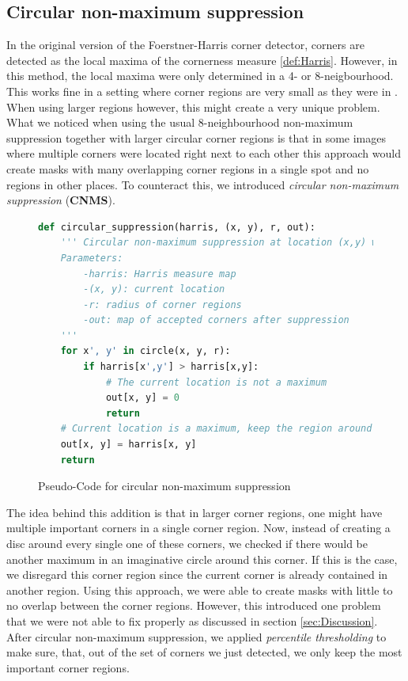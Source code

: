 \subsection{Circular non-maximum suppression}\label{sub:Suppression}
In the original version of the Foerstner-Harris corner detector, corners are detected as the local
maxima of the cornerness measure \eqref{def:Harris}. However, in this method, the local maxima were
only determined in a 4- or 8-neigbourhood. This works fine in a setting where corner regions are
very small as they were in \cite{zimmer07}. When using larger regions however, this might create a
very unique problem.\\
What we noticed when using the usual 8-neighbourhood non-maximum suppression together with larger
circular corner regions is that in some
images where multiple corners were located right next to each other this approach would create
masks with many overlapping corner regions in a single spot and no regions in other places. To
counteract this, we introduced \textit{circular non-maximum suppression} (\textbf{CNMS}).\\
\begin{figure}
    \begin{lstlisting}[language=Python]
def circular_suppression(harris, (x, y), r, out):
    ''' Circular non-maximum suppression at location (x,y) with radius r.
    Parameters:
        -harris: Harris measure map
        -(x, y): current location
        -r: radius of corner regions
        -out: map of accepted corners after suppression
    '''
    for x', y' in circle(x, y, r):
        if harris[x',y'] > harris[x,y]:
            # The current location is not a maximum
            out[x, y] = 0
            return
    # Current location is a maximum, keep the region around it
    out[x, y] = harris[x, y]
    return 
    \end{lstlisting}
    \caption{Pseudo-Code for circular non-maximum suppression}
\end{figure}
The idea behind this addition is that in larger corner regions, one might have multiple 
important corners in a single corner region.
Now, instead of creating a disc around every single one of these corners, we checked if there 
would be another maximum in an imaginative circle around this corner. 
If this is the case, we disregard this corner region since the current corner is already 
contained in another region.
Using this approach, we were able to create masks with little to no overlap between the
corner regions. However, this introduced one problem that we were not able to fix properly as
discussed in section \ref{sec:Discussion}.
After circular non-maximum suppression, we applied \textit{percentile thresholding} to make sure,
that, out of the set of corners we just detected, we only keep the most important corner regions. 

